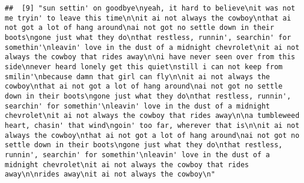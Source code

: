 \documentclass[]{article}
\begin{document}
\begin{verbatim}
##  [9] "sun settin' on goodbye\nyeah, it hard to believe\nit was not me tryin' to leave this time\n\nit ai not always the cowboy\nthat ai not got a lot of hang around\nai not got no settle down in their boots\ngone just what they do\nthat restless, runnin', searchin' for somethin'\nleavin' love in the dust of a midnight chevrolet\nit ai not always the cowboy that rides away\n\ni have never seen over from this side\nnever heard lonely get this quiet\nstill i can not keep from smilin'\nbecause damn that girl can fly\n\nit ai not always the cowboy\nthat ai not got a lot of hang around\nai not got no settle down in their boots\ngone just what they do\nthat restless, runnin', searchin' for somethin'\nleavin' love in the dust of a midnight chevrolet\nit ai not always the cowboy that rides away\n\na tumbleweed heart, chasin' that wind\ngoin' too far, wherever that is\n\nit ai not always the cowboy\nthat ai not got a lot of hang around\nai not got no settle down in their boots\ngone just what they do\nthat restless, runnin', searchin' for somethin'\nleavin' love in the dust of a midnight chevrolet\nit ai not always the cowboy that rides away\n\nrides away\nit ai not always the cowboy\n"                                                                                                                                                                                                                                                                                                                                                                                                                                                                                                                                                                                                                                                                                                                                                                                                                                                                                                                                                                                                                                                                                                                                                                                                                                                                                                                                                                                                                                                                                                                                                                                                                                                                                                                                             

\end{verbatim}
\end{document}

